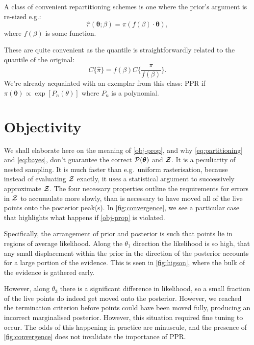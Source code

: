 \documentclass[usenatbib]{mnras}
\begin{document}
A class of convenient repartitioning schemes is one where the prior's
argument is re-sized e.g.:
\begin{equation}
  \label{eq:argument-resize}
  \hat{\pi} (\bm{\theta}; \beta) = \pi (f(\beta)\cdot\bm{\theta}),
\end{equation}
where \(f(\beta)\) is some function.

These are quite convenient as the quantile is straightforwardly
related to the quantile of the original:
\begin{equation}
  \label{eq:quantile-stuff}
  C\{\hat{\pi}\} = f(\beta) C\{\frac{\pi}{f(\beta)}\}.
\end{equation}
We're already acquainted with an exemplar from this class: PPR if
\( \pi (\bm{\theta}) \propto \exp [P_{n}(\theta)]\) where $P_{n}$ is a
polynomial.


\section{Objectivity\label{sec:objectivity}}
We shall elaborate here on the meaning of \cref{obj-prop}, and why
\cref{eq:partitioning} and \cref{eq:bayes}, don't guarantee the
correct \( {\cal P}(\bm{\theta})\) and ${\cal Z}$.  It is a
peculiarity of nested sampling. It is much faster than e.g.~uniform
rasterisation, because instead of evaluating ${\cal Z}$ exactly, it
uses a statistical argument to successively approximate ${\cal
  Z}$. The four necessary properties outline the requirements for
errors in ${\cal Z}$ to accumulate more slowly, than is necessary to
have moved all of the live points onto the posterior peak(s). In
\cref{fig:convergence}, we see a particular case that highlights what
happens if \cref{obj-prop} is violated.

Specifically, the arrangement of prior and posterior is such that
points lie in regions of average likelihood. Along the $\theta_{1}$
direction the likelihood is so high, that any small displacement
within the prior in the direction of the posterior accounts for a
large portion of the evidence. This is seen in \cref{fig:higson},
where the bulk of the evidence is gathered early.

However, along $\theta_{3}$ there is a significant difference in
likelihood, so a small fraction of the live points do indeed get moved
onto the posterior. However, we reached the termination criterion
before points could have been moved fully, producing an incorrect
marginalised posterior. However, this situation required fine tuning
to occur. The odds of this happening in practice are minuscule, and
the presence of \cref{fig:convergence} does not invalidate the
importance of PPR. 
\end{document}
